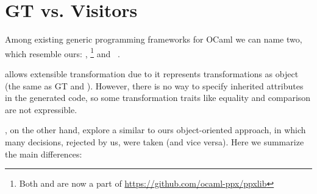 \section{GT vs. Visitors}

Among existing generic programming frameworks for OCaml we can name two, which resemble ours: , \footnote{Both  and  are now a part of \url{https://github.com/ocaml-ppx/ppxlib}} and ~\cite{Visitors}.


 allows extensible transformation due to it represents transformations as object (the same as GT and ). However,  there is no way to specify inherited attributes in the generated code, so some transformation traits like equality and comparison are not expressible.

, on the other hand, explore a similar to ours object-oriented approach, in which many decisions, rejected by us, were taken (and vice versa). Here
we summarize the main differences:

